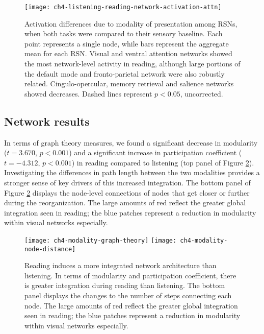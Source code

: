 \begin{figure}[t]
	\centering
	\texttt{[image: ch4-listening-reading-network-activation-attn]}
    \caption[Activation differences due to modality of presentation among RSNs]{Activation differences due to modality of presentation among RSNs, when both tasks were compared to their sensory baseline. Each point represents a single node, while bars represent the aggregate mean for each RSN. Visual and ventral attention networks showed the most network-level activity in reading, although large portions of the default mode and fronto-parietal network were also robustly related. Cingulo-opercular, memory retrieval and salience networks showed decreases. Dashed lines represent $p < 0.05$, uncorrected.}
	\label{fig:ch4-listening-reading-network-activation-attn}
\end{figure}

\subsection{Network results}

In terms of graph theory measures, we found a significant decrease in modularity ($t = 3.670$, $p < 0.001$) and a significant increase in participation coefficient ($t = -4.312$, $p < 0.001$) in reading compared to listening (top panel of Figure \ref{fig:ch4-modality-graph-theory}). Investigating the differences in path length between the two modalities provides a stronger sense of key drivers of this increased integration. The bottom panel of Figure \ref{fig:ch4-modality-graph-theory} displays the node-level connections of nodes that get closer or further during the reorganization. The large amounts of red reflect the greater global integration seen in reading; the blue patches represent a reduction in modularity within visual networks especially.

\begin{figure}[t!]
	\centering
	\texttt{[image: ch4-modality-graph-theory]}
	\texttt{[image: ch4-modality-node-distance]}
    \caption[Reading induces a more integrated network architecture than listening]{Reading induces a more integrated network architecture than listening. In terms of modularity and participation coefficient, there is greater integration during reading than listening. The bottom panel displays the changes to the number of steps connecting each node. The large amounts of red reflect the greater global integration seen in reading; the blue patches represent a reduction in modularity within visual networks especially.}
	\label{fig:ch4-modality-graph-theory}
\end{figure}


